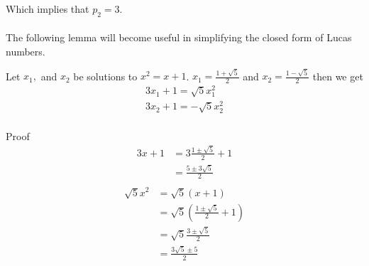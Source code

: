 \documentclass[a4paper]{article}
\begin{document}
Which implies that $p_2 = 3$.
\\
\\
The following lemma will become useful in simplifying the closed form of Lucas numbers.
\begin{theorem}\label{fib:lucas lemma}
Let $x_1,$ and $x_2$ be solutions to $x^2 = x+1$.
$x_1 = \frac{1 + \sqrt{5}}{2}$ and
$x_2 = \frac{1 - \sqrt{5}}{2}$ then we get
\begin{equation*}
\begin{aligned}
3x_1 + 1 = \sqrt{5} x_1^2  \\
3x_2 + 1 = -\sqrt{5} x_2^2  \\
\end{aligned}
\end{equation*}

Proof
\begin{equation*}
\begin{split}
3x + 1 &= 3 \frac{1 \pm \sqrt{5}}{2} + 1 \\
&= \frac{5 \pm 3\sqrt{5}}{2} \\
\end{split}
\end{equation*}
\begin{equation*}
\begin{split}
\sqrt{5} x^2 &= \sqrt{5} (x + 1) \\
&= \sqrt{5} (\frac{1 \pm \sqrt{5}}{2} + 1) \\
&= \sqrt{5} \frac{3 \pm \sqrt{5}}{2}  \\
&= \frac{3\sqrt{5} \pm 5}{2}  \\
\end{split}
\end{equation*}
\end{theorem}
\end{document}

